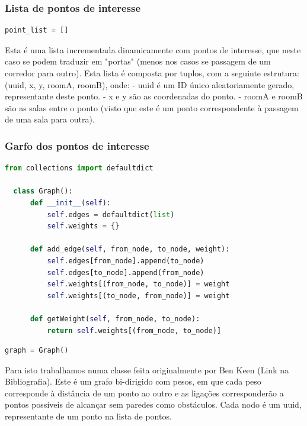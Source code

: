 \documentclass{article}
\begin{document}
\subsubsection{Lista de pontos de interesse}
\begin{lstlisting}[language=Python]
point_list = []
\end{lstlisting}

Esta é uma lista incrementada dinamicamente com pontos de interesse, que neste caso se podem traduzir em "portas" (menos nos casos se passagem de um corredor para outro).
Esta lista é composta por tuplos, com a seguinte estrutura: (uuid, x, y, roomA, roomB), onde:
\newline - uuid é um ID único aleatoriamente gerado, representante deste ponto. 
\newline - x e y são as coordenadas do ponto.
\newline - roomA e roomB são as salas entre o ponto (visto que este é um ponto correspondente à passagem de uma sala para outra).

\subsubsection{Garfo dos pontos de interesse}
\begin{lstlisting}[language=Python]
  from collections import defaultdict

  class Graph():
      def __init__(self):
          self.edges = defaultdict(list)
          self.weights = {}
      
      def add_edge(self, from_node, to_node, weight):
          self.edges[from_node].append(to_node)
          self.edges[to_node].append(from_node)
          self.weights[(from_node, to_node)] = weight
          self.weights[(to_node, from_node)] = weight
  
      def getWeight(self, from_node, to_node):
          return self.weights[(from_node, to_node)]  
\end{lstlisting}
\begin{lstlisting}[language=Python]
graph = Graph()
\end{lstlisting}

Para isto trabalhamos numa classe feita originalmente por Ben Keen (Link na Bibliografia). Este é um grafo bi-dirigido com pesos, em que cada peso corresponde à distância de um ponto ao outro e as ligações corresponderão a pontos possíveis de alcançar sem paredes como obstáculos. Cada nodo é um uuid, representante de um ponto na lista de pontos.
\end{document}
